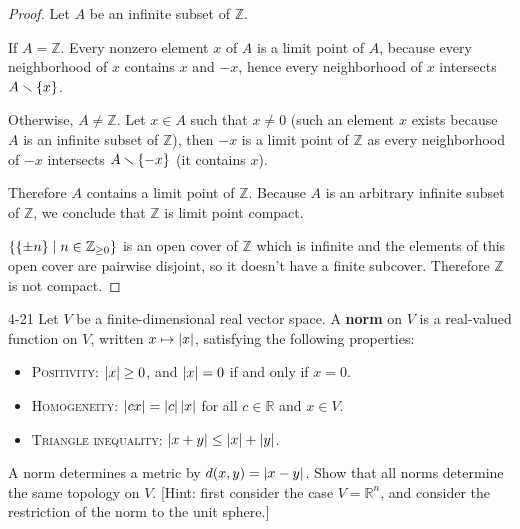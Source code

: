 \begin{proof}
	Let $A$ be an infinite subset of $\mathbb{Z}$.

	If $A = \mathbb{Z}$. Every nonzero element $x$ of $A$ is a limit point of $A$, because every neighborhood of $x$ contains $x$ and $-x$, hence every neighborhood of $x$ intersects $A\smallsetminus\left\{{x}\right\}$.

	Otherwise, $A \ne \mathbb{Z}$. Let $x\in A$ such that $x\ne 0$ (such an element $x$ exists because $A$ is an infinite subset of $\mathbb{Z}$), then $-x$ is a limit point of $\mathbb{Z}$ as every neighborhood of $-x$ intersects $A\smallsetminus\left\{{-x}\right\}$ (it contains $x$).

	Therefore $A$ contains a limit point of $\mathbb{Z}$. Because $A$ is an arbitrary infinite subset of $\mathbb{Z}$, we conclude that $\mathbb{Z}$ is limit point compact.

	$\left\{{ \left\{{\pm n}\right\} \mid n\in\mathbb{Z}_{\geq 0} }\right\}$ is an open cover of $\mathbb{Z}$ which is infinite and the elements of this open cover are pairwise disjoint, so it doesn't have a finite subcover. Therefore $\mathbb{Z}$ is not compact.
\end{proof}

\begin{problem}{4-21}
Let $V$ be a finite-dimensional real vector space. A \textbf{norm} on $V$ is a real-valued function on $V$, written $x\mapsto \left\vert{x}\right\vert$, satisfying the following properties:
\begin{itemize}
	\item \textsc{Positivity}: $\left\vert{x}\right\vert \geq 0$, and $\left\vert{x}\right\vert = 0$ if and only if $x = 0$.
	\item \textsc{Homogeneity}: $\left\vert{cx}\right\vert = \left\vert{c}\right\vert\left\vert{x}\right\vert$ for all $c\in \mathbb{R}$ and $x\in V$.
	\item \textsc{Triangle inequality}: $\left\vert{x + y}\right\vert \leq \left\vert{x}\right\vert + \left\vert{y}\right\vert$.
\end{itemize}

A norm determines a metric by $d(x, y) = \left\vert{x - y}\right\vert$. Show that all norms determine the same topology on $V$. [Hint: first consider the case $V = \mathbb{R}^{n}$, and consider the restriction of the norm to the unit sphere.]
\end{problem}

